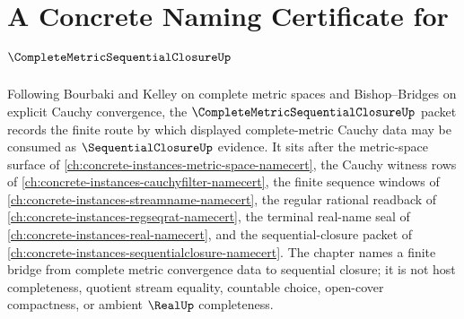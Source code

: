 \chapter{A Concrete Naming Certificate for $\CompleteMetricSequentialClosureUp$}
\label{ch:concrete-instances-complete-metric-sequential-closure-namecert}

Following Bourbaki and Kelley on complete metric spaces and Bishop--Bridges on explicit Cauchy convergence, the $\CompleteMetricSequentialClosureUp$ packet records the finite route by which displayed complete-metric Cauchy data may be consumed as $\SequentialClosureUp$ evidence. It sits after the metric-space surface of \autoref{ch:concrete-instances-metric-space-namecert}, the Cauchy witness rows of \autoref{ch:concrete-instances-cauchyfilter-namecert}, the finite sequence windows of \autoref{ch:concrete-instances-streamname-namecert}, the regular rational readback of \autoref{ch:concrete-instances-regseqrat-namecert}, the terminal real-name seal of \autoref{ch:concrete-instances-real-namecert}, and the sequential-closure packet of \autoref{ch:concrete-instances-sequentialclosure-namecert}. The chapter names a finite bridge from complete metric convergence data to sequential closure; it is not host completeness, quotient stream equality, countable choice, open-cover compactness, or ambient $\RealUp$ completeness.

